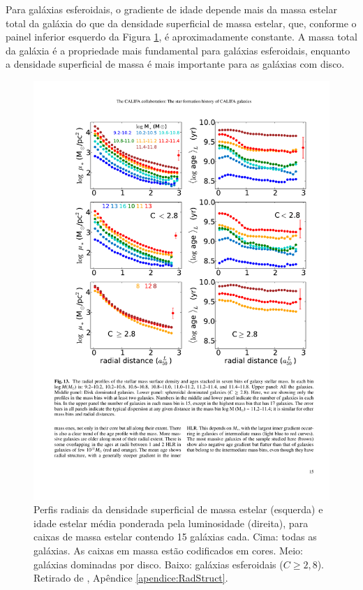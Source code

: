 Para galáxias esferoidais, o gradiente de idade depende mais da massa estelar
total da galáxia do que da densidade superficial de massa estelar, que, conforme
o painel inferior esquerdo da Figura \ref{fig:radStruct3}, é aproximadamente
constante. A massa total da galáxia é a propriedade mais fundamental para
galáxias esferoidais, enquanto a densidade superficial de massa é mais
importante para as galáxias com disco.


\begin{figure}
	\includegraphics[width=0.8\columnwidth]{figuras/radstruct-03}
	\caption[Perfis radiais para várias caixas de massa estelar]
	{Perfis radiais da densidade superficial de massa estelar (esquerda) e idade
	estelar média ponderada pela luminosidade (direita), para caixas de
	massa estelar contendo 15 galáxias cada. Cima: todas as galáxias. As caixas
	em massa estão codificados em cores. Meio: galáxias dominadas por disco.
	Baixo: galáxias esferoidais ($C \geq 2,8$). Retirado de \citet[figura
	13]{GonzalezDelgado2014a}, Apêndice \ref{apendice:RadStruct}.}
	\label{fig:radStruct3}
\end{figure}

%

